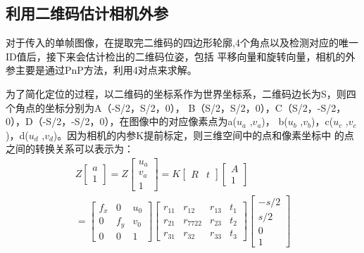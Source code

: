\subsection{利用二维码估计相机外参}
\label{sec:2.2.3}
对于传入的单帧图像，在提取完二维码的四边形轮廓,4个角点以及检测对应的唯一ID值后，接下来会估计检出的二维码位姿，包括
平移向量和旋转向量，相机的外参主要是通过PnP方法，利用4对点来求解。

为了简化定位的过程，以二维码的坐标系作为世界坐标系，二维码边长为S，则四个角点的坐标分别为A（-S/2，S/2，0），
B（S/2，S/2，0），C（S/2，-S/2，0），D（-S/2，-S/2，0），在图像中的对应像素点为a($u_a$ ,$v_a$)，
b($u_b$ ,$v_b$)，c($u_c$ ,$v_c$)，d($u_d$ ,$v_d$)。因为相机的内参K提前标定，则三维空间中的点和像素坐标中
的点之间的转换关系可以表示为：
\begin{equation}
\begin{split}
  Z{
  \left[ \begin{array}{ccc}
  a\\1
  \end{array} 
  \right ]}=Z{
  \left[ \begin{array}{ccc}
  u_a\\v_a\\1
  \end{array} \right ]}=K{
  \left[ \begin{array}{ccc}
  R&t
  \end{array} \right ]}{
  \left[ \begin{array}{ccc}
  A\\1
  \end{array} \right ]} \\
  ={
  \left[ \begin{array}{ccc}
  f_x & 0 & u_0\\0 & f_y &v_0 \\0 & 0 & 1
  \end{array} \right ]}{
  \left[ \begin{array}{cccc}
  r_{11}&r_{12}&r_{13}&t_1\\r_{21}&r_{7722}&r_{23}&t_2\\r_{31}&r_{32}&r_{33}&t_3
  \end{array} \right ]}{
  \left[ \begin{array}{ccc}
  -s/2\\s/2\\0\\1
  \end{array} \right ]}
\end{split}
\label{equ:mark2pose}
\end{equation}

